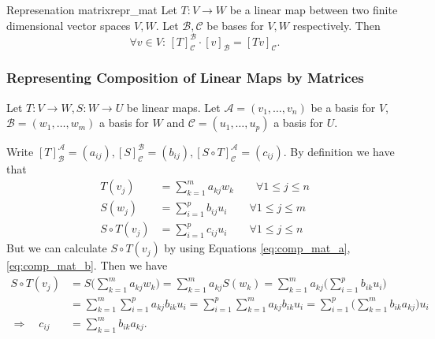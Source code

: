 \begin{proposition}{Represenation matrix}{repr_mat}
	Let $T:V \to W$ be a linear map between two finite dimensional vector spaces $V, W$. Let $\mathcal{B}, \mathcal{C}$ be bases for $V, W$ respectively. Then 
	\[
	\forall v \in V : \, [T]^{\mathcal{B}}_{\mathcal{C}} \cdot [v]_{\mathcal{B}} = [Tv]_{\mathcal{C}}.
	\]
\end{proposition}

\subsubsection{Representing Composition of Linear Maps by Matrices}
Let $T:V \to W, S:W \to U$ be linear maps. Let $\mathcal{A} = (v_1, \hdots , v_n)$ be a basis for $V$, $\mathcal{B} = (w_1, \hdots , w_m)$ a basis for $W$ and $\mathcal{C} = (u_1, \hdots , u_p)$ a basis for $U$.

Write $[T]^{\mathcal{A}}_{\mathcal{B}} = (a_{ij}), [S]^{\mathcal{B}}_{\mathcal{C}} = (b_{ij}), [S \circ T]^{\mathcal{A}}_{\mathcal{C}} = (c_{ij})$. By definition we have that
\begin{align}
	\label{eq:comp_mat_a}
	T(v_j) &= \sum_{k=1}^{m} a_{kj} w_k \qquad \forall 1 \leq j \leq n\\
	\label{eq:comp_mat_b}
	S(w_j) &= \sum_{i=1}^{p} b_{ij} u_i \qquad \forall 1 \leq j \leq m\\
	\label{eq:comp_mat_c}
	S \circ T(v_j) &= \sum_{i=1}^{p} c_{ij} u_i \qquad \forall 1 \leq j \leq n
\end{align}
But we can calculate $S \circ T(v_j)$ by using Equations \eqref{eq:comp_mat_a}, \eqref{eq:comp_mat_b}. Then we have
\begin{align*}
	S \circ T(v_j) &= S\big(\sum_{k=1}^{m} a_{kj} w_k\big) = \sum_{k=1}^{m} a_{kj} S(w_k) = \sum_{k=1}^{m} a_{kj} \big(\sum_{i=1}^{p}b_{ik} u_i \big)\\
	&= \sum_{k=1}^{m}\sum_{i=1}^{p} a_{kj}b_{ik} u_i = \sum_{i=1}^{p}\sum_{k=1}^{m} a_{kj}b_{ik} u_i = \sum_{i=1}^{p} \big(\sum_{k=1}^{m} b_{ik}a_{kj}\big) u_i\\
	\Longrightarrow \quad c_{ij} &= \sum_{k=1}^{m} b_{ik}a_{kj}.
\end{align*}
